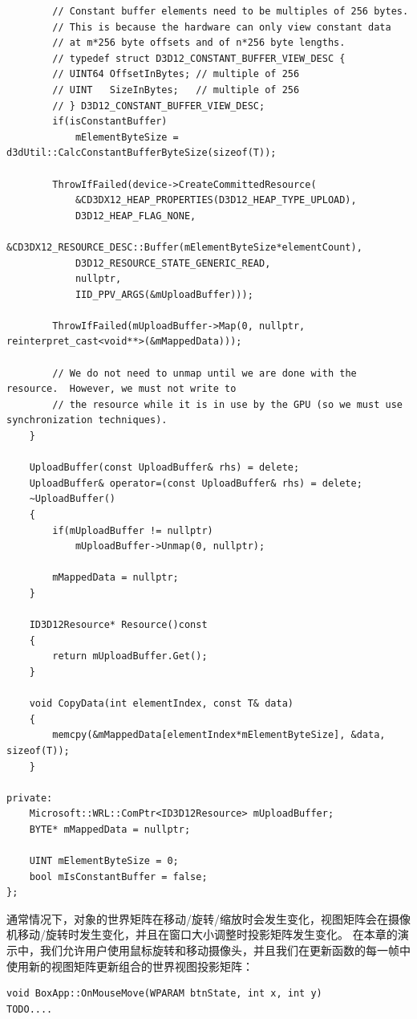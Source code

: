 \documentclass[11pt,a4paper,oldfontcommands]{memoir}
\begin{document}
{\begin{lstlisting}
        // Constant buffer elements need to be multiples of 256 bytes.
        // This is because the hardware can only view constant data 
        // at m*256 byte offsets and of n*256 byte lengths. 
        // typedef struct D3D12_CONSTANT_BUFFER_VIEW_DESC {
        // UINT64 OffsetInBytes; // multiple of 256
        // UINT   SizeInBytes;   // multiple of 256
        // } D3D12_CONSTANT_BUFFER_VIEW_DESC;
        if(isConstantBuffer)
            mElementByteSize = d3dUtil::CalcConstantBufferByteSize(sizeof(T));

        ThrowIfFailed(device->CreateCommittedResource(
            &CD3DX12_HEAP_PROPERTIES(D3D12_HEAP_TYPE_UPLOAD),
            D3D12_HEAP_FLAG_NONE,
            &CD3DX12_RESOURCE_DESC::Buffer(mElementByteSize*elementCount),
            D3D12_RESOURCE_STATE_GENERIC_READ,
            nullptr,
            IID_PPV_ARGS(&mUploadBuffer)));

        ThrowIfFailed(mUploadBuffer->Map(0, nullptr, reinterpret_cast<void**>(&mMappedData)));

        // We do not need to unmap until we are done with the resource.  However, we must not write to
        // the resource while it is in use by the GPU (so we must use synchronization techniques).
    }

    UploadBuffer(const UploadBuffer& rhs) = delete;
    UploadBuffer& operator=(const UploadBuffer& rhs) = delete;
    ~UploadBuffer()
    {
        if(mUploadBuffer != nullptr)
            mUploadBuffer->Unmap(0, nullptr);

        mMappedData = nullptr;
    }

    ID3D12Resource* Resource()const
    {
        return mUploadBuffer.Get();
    }

    void CopyData(int elementIndex, const T& data)
    {
        memcpy(&mMappedData[elementIndex*mElementByteSize], &data, sizeof(T));
    }

private:
    Microsoft::WRL::ComPtr<ID3D12Resource> mUploadBuffer;
    BYTE* mMappedData = nullptr;

    UINT mElementByteSize = 0;
    bool mIsConstantBuffer = false;
};
\end{lstlisting}
\begin{flushleft}
通常情况下，对象的世界矩阵在移动/旋转/缩放时会发生变化，视图矩阵会在摄像机移动/旋转时发生变化，并且在窗口大小调整时投影矩阵发生变化。 在本章的演示中，我们允许用户使用鼠标旋转和移动摄像头，并且我们在更新函数的每一帧中使用新的视图矩阵更新组合的世界视图投影矩阵：
\end{flushleft}
\begin{lstlisting}
void BoxApp::OnMouseMove(WPARAM btnState, int x, int y)
TODO....
\end{lstlisting}

}
\end{document}
